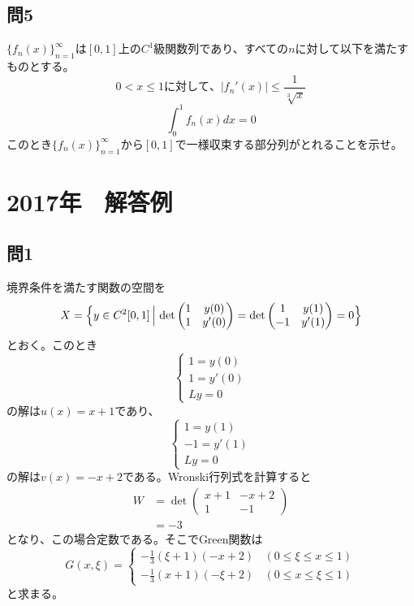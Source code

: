 \documentclass{jsarticle}
\begin{document}
\subsection*{問5}
$\{ f_n(x)\}_{n=1}^{\infty}$は$[0,1]$上の$C^1$級関数列であり、すべての$n$に対して以下を満たすものとする。\\
$$
0<x \leq 1に対して、|f_n'(x)|\leq \frac{1}{\sqrt[3]{x}}
$$
$$
\int_0^1 f_n(x)dx =0
$$
このとき$\{ f_n(x)\}_{n=1}^{\infty}$から$[0,1]$で一様収束する部分列がとれることを示せ。

\newpage
\section*{2017年　解答例}
\subsection*{問1}
境界条件を満たす関数の空間を
$$
X=\Bigl\{ y \in C^2[0,1] \Big\arrowvert \det \begin{pmatrix} 1 & y(0) \\ 1 & y'(0) \end{pmatrix} = \det \begin{pmatrix} 1 & y(1) \\ -1 & y'(1) \end{pmatrix} = 0 \Bigr\}
$$
とおく。このとき
$$
\begin{cases}
  1 = y(0) \\
  1 = y'(0) \\
  Ly = 0
\end{cases}
$$
の解は$u(x)=x+1$であり、
$$
\begin{cases}
  1 = y(1) \\
  -1 = y'(1) \\
  Ly = 0
\end{cases}
$$
の解は$v(x)=-x+2$である。Wronski行列式を計算すると
\begin{align*}
W &= \det \begin{pmatrix}
x+1 & -x+2 \\ 1& -1
\end{pmatrix} \\
&=-3
\end{align*}
となり、この場合定数である。そこでGreen関数は
$$
G(x,\xi) = \begin{cases}
-\frac{1}{3}(\xi + 1)(-x+2) \  \ \ \ (0 \leq \xi \leq x \leq 1) \\
-\frac{1}{3}(x + 1)(-\xi+2) \  \ \ \ (0 \leq x \leq \xi \leq 1)
\end{cases}
$$
と求まる。
\end{document}
